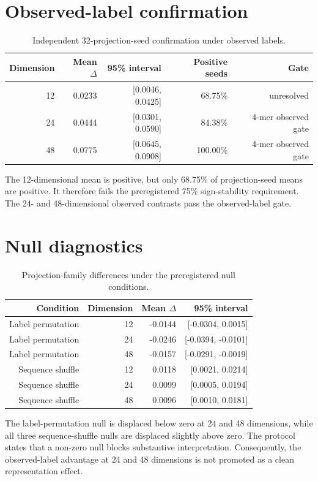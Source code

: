 \documentclass[11pt]{article}
\begin{document}
\section{Observed-label confirmation}
\begin{table}[htbp]
\centering
\begin{tabular}{rrrrr}
\toprule
Dimension & Mean $\Delta$ & 95\% interval & Positive seeds & Gate \\
\midrule
12 & 0.0233 & [0.0046, 0.0425] & 68.75\% & unresolved \\
24 & 0.0444 & [0.0301, 0.0590] & 84.38\% & 4-mer observed gate \\
48 & 0.0775 & [0.0645, 0.0908] & 100.00\% & 4-mer observed gate \\
\bottomrule
\end{tabular}
\caption{Independent 32-projection-seed confirmation under observed labels.}
\label{tab:observed}
\end{table}

The 12-dimensional mean is positive, but only 68.75\% of projection-seed means are positive. It therefore fails the preregistered 75\% sign-stability requirement. The 24- and 48-dimensional observed contrasts pass the observed-label gate.

\section{Null diagnostics}
\begin{table}[htbp]
\centering
\begin{tabular}{rrrr}
\toprule
Condition & Dimension & Mean $\Delta$ & 95\% interval \\
\midrule
Label permutation & 12 & -0.0144 & [-0.0304, 0.0015] \\
Label permutation & 24 & -0.0246 & [-0.0394, -0.0101] \\
Label permutation & 48 & -0.0157 & [-0.0291, -0.0019] \\
Sequence shuffle & 12 & 0.0118 & [0.0021, 0.0214] \\
Sequence shuffle & 24 & 0.0099 & [0.0005, 0.0194] \\
Sequence shuffle & 48 & 0.0096 & [0.0010, 0.0181] \\
\bottomrule
\end{tabular}
\caption{Projection-family differences under the preregistered null conditions.}
\label{tab:nulls}
\end{table}

The label-permutation null is displaced below zero at 24 and 48 dimensions, while all three sequence-shuffle nulls are displaced slightly above zero. The protocol states that a non-zero null blocks substantive interpretation. Consequently, the observed-label advantage at 24 and 48 dimensions is not promoted as a clean representation effect.
\end{document}
